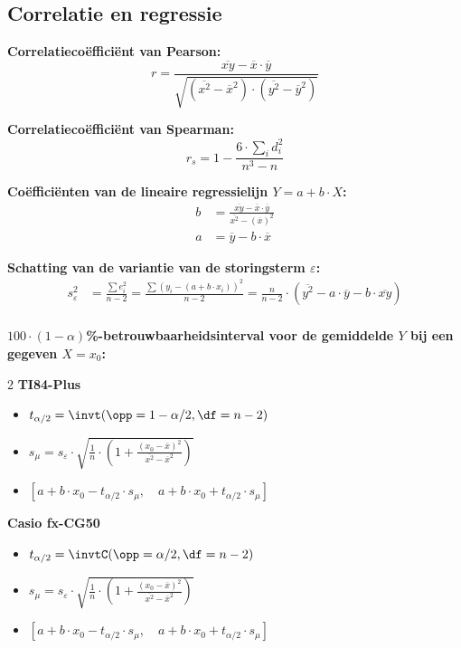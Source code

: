 \subsection*{Correlatie en regressie}

\textbf{Correlatieco\"effici\"ent van Pearson:}
\[
    r = \frac{\overline{xy} - \overline{x} \cdot \overline{y}}{\sqrt{(\overline{x^2} - \overline{x}^2)\cdot(\overline{y^2} - \overline{y}^2)}}
\]

\textbf{Correlatieco\"effici\"ent van Spearman:}
\[
    r_s = 1 - \frac{6 \cdot \sum_i d_i^2}{n^3-n}
\]

\textbf{Co\"effici\"enten van de lineaire regressielijn $Y = a + b\cdot X$:}
\begin{align*}
    b &= \frac{\overline{xy} - \overline{x} \cdot \overline{y}}{\overline{x^2} - (\overline{x})^2} \\
    a &= \overline{y} - b \cdot \overline{x}
\end{align*}

\textbf{Schatting van de variantie van de storingsterm $\varepsilon$:}
\begin{align*}
    s_{\varepsilon}^2 &= \frac{\sum e_i^2}{n - 2} = \frac{\sum \left(y_i - (a + b \cdot x_i)\right)^2}{n - 2}=  \frac{n}{n-2} \cdot \left( \overline{y^2} - a \cdot \overline{y} - b \cdot \overline{xy} \right) \\ 
\end{align*}

\textbf{\boldmath$100\cdot(1-\alpha)$\si{\percent}-betrouwbaarheidsinterval voor de gemiddelde $Y$ bij een gegeven $X = x_0$:}
    \begin{multicols}{2}
        \centering\textbf{TI84-Plus}
            \begin{itemize}
                \item $t_{\alpha/2} = \invt(\opp=1-\alpha/2, \df = n - 2)$
                \item $s_\mu = s_{\varepsilon} \cdot \sqrt{ \frac{1}{n} \cdot \left( 1 + \frac{(x_0 - \overline{x})^2}{\overline{x^2} - \overline{x}^2} \right) }$
                \item $[a+b\cdot x_0 - t_{\alpha/2} \cdot s_\mu, \quad a+b\cdot x_0 + t_{\alpha/2} \cdot s_\mu]$
            \end{itemize}

            \columnbreak

            \centering\textbf{Casio fx-CG50}
            \begin{itemize}
                \item $t_{\alpha/2} = \invtC(\opp=\alpha/2, \df = n - 2)$
                \item $s_\mu = s_{\varepsilon} \cdot \sqrt{ \frac{1}{n} \cdot \left( 1 + \frac{(x_0 - \overline{x})^2}{\overline{x^2} - \overline{x}^2} \right) }$
                \item $[a+b\cdot x_0 - t_{\alpha/2} \cdot s_\mu, \quad a+b\cdot x_0 + t_{\alpha/2} \cdot s_\mu]$
            \end{itemize}
    \end{multicols}


